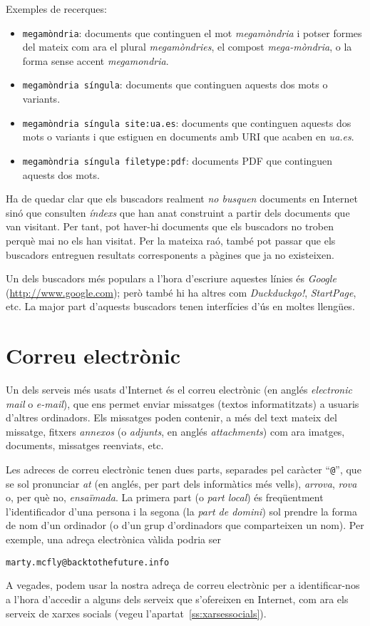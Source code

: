 Exemples de recerques:
\begin{itemize}
\item \texttt{megamòndria}: documents que continguen el mot
  \emph{megamòndria} i potser formes del mateix com ara el plural
  \emph{megamòndries}, el compost \emph{mega-mòndria}, o la forma
  sense accent \emph{megamondria}.
\item \texttt{megamòndria síngula}: documents que continguen aquests
  dos mots o variants.
\item \texttt{megamòndria síngula site:ua.es}: documents que
  continguen aquests dos mots o variants i que estiguen en documents
  amb URI que acaben en \emph{ua.es}.
\item \texttt{megamòndria síngula filetype:pdf}: documents PDF que
  continguen aquests dos mots.
\end{itemize}

Ha de quedar clar que els buscadors realment \emph{no busquen}
documents en Internet sinó que consulten \emph{índexs} que han anat
construint a partir dels documents que van visitant. Per tant, pot
haver-hi documents que els buscadors no troben perquè mai no els han
visitat. Per la mateixa raó, també pot passar que els buscadors
entreguen resultats corresponents a pàgines que ja no existeixen.

Un dels buscadors més populars a l'hora d'escriure aquestes línies és
\emph{Google} (\url{http://www.google.com}); però també hi ha altres
com \emph{Duckduckgo!}, \emph{StartPage}, etc. La major part d'aquests
buscadors tenen interfícies d'ús en moltes llengües.

\section{Correu electrònic}
\label{ss:correue}
Un dels serveis més usats d'Internet és el correu electrònic (en
anglés \emph{electronic mail} o \emph{e-mail}), que ens permet enviar
missatges (textos informatitzats) a usuaris d'altres ordinadors.  Els
missatges poden contenir, a més del text mateix del missatge, fitxers
\emph{annexos} (o \emph{adjunts}, en anglés \emph{attachments}) com
ara imatges, documents, missatges reenviats, etc.

Les adreces de correu electrònic tenen dues parts, separades pel
caràcter ``\texttt{@}'', que se sol pronunciar \emph{at} (en anglés,
per part dels informàtics més vells), {\em arrova}, \emph{rova} o, per
què no, \emph{ensaïmada}. La primera part (o \emph{part local}) és
freqüentment l'identificador d'una persona i la segona (la \emph{part
  de domini}) sol prendre la forma de nom d'un ordinador (o d'un grup
d'ordinadors que comparteixen un nom). Per exemple, una adreça
electrònica vàlida podria ser
\begin{center}
\texttt{marty.mcfly@backtothefuture.info}
\end{center}
A vegades, podem usar la nostra adreça de correu electrònic per a
identificar-nos a l'hora d'accedir a alguns dels serveix que
s'ofereixen en Internet, com ara els serveix de xarxes socials (vegeu
l'apartat~\ref{ss:xarsessocials}).

